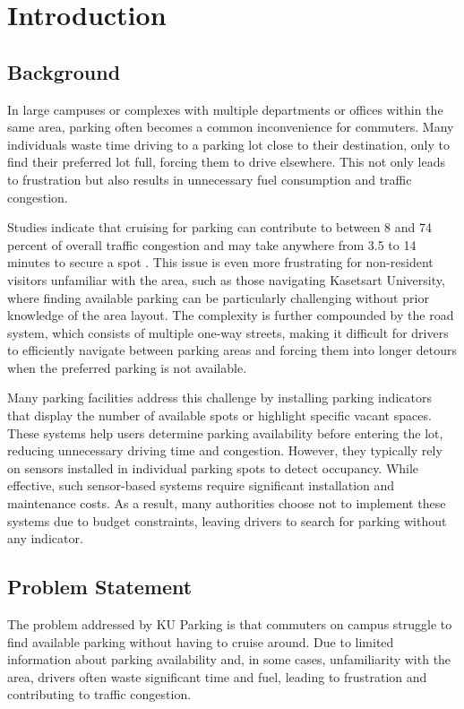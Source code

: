 \chapter{Introduction}
\label{chap:introduction}

\section{Background}
\label{section:background}

In large campuses or complexes with multiple departments or offices within the same area, parking often becomes a common inconvenience for commuters.
Many individuals waste time driving to a parking lot close to their destination, only to find their preferred lot full, forcing them to drive elsewhere.
This not only leads to frustration but also results in unnecessary fuel consumption and traffic congestion.


Studies indicate that cruising for parking can contribute to between 8 and 74 percent of overall traffic congestion and may take anywhere from 3.5 to 14 minutes to secure a spot \cite{shoup:2006}.
This issue is even more frustrating for non-resident visitors unfamiliar with the area, such as those navigating Kasetsart University, where finding available parking can be particularly challenging without prior knowledge of the area layout.
The complexity is further compounded by the road system, which consists of multiple one-way streets, making it difficult for drivers to efficiently navigate between parking areas and forcing them into longer detours when the preferred parking is not available.


Many parking facilities address this challenge by installing parking indicators that display the number of available spots or highlight specific vacant spaces.
These systems help users determine parking availability before entering the lot, reducing unnecessary driving time and congestion.
However, they typically rely on sensors installed in individual parking spots to detect occupancy.
While effective, such sensor-based systems require significant installation and maintenance costs.
As a result, many authorities choose not to implement these systems due to budget constraints, leaving drivers to search for parking without any indicator.

\section{Problem Statement}
\label{section:problem-statement}
The problem addressed by KU Parking is that commuters on campus struggle to find available parking without having to cruise around. Due to limited information about parking availability and, in some cases, unfamiliarity with the area, drivers often waste significant time and fuel, leading to frustration and contributing to traffic congestion. 

